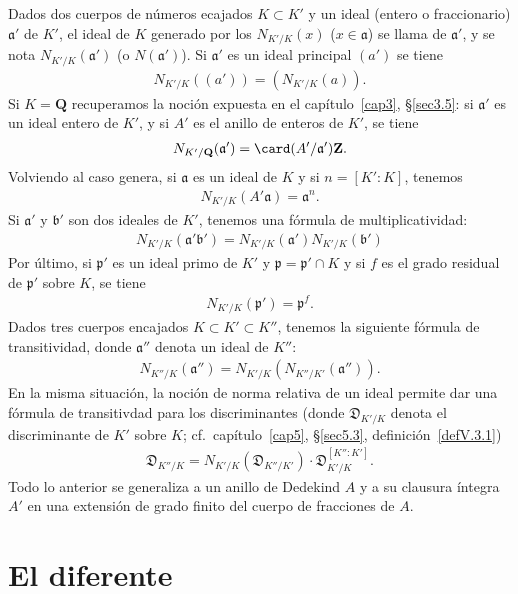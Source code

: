 \documentclass[bibtotoc,leqno,spanish]{amsbook}
\let\emph\relax %
\newcommand{\QQ}{\mathbf{Q}}
\newcommand{\ZZ}{\mathbf{Z}}
\newcommand{\idl}[1]{\mathfrak{#1}}
\newcommand{\disc}{\mathfrak{D}}
\numberwithin{equation}{section}
\theoremstyle{note}
\theoremstyle{note}
\theoremstyle{rem}
\numberwithin{theorem}{section}
\numberwithin{proposition}{section}
\numberwithin{definition}{section}
\numberwithin{lemma}{section}
\numberwithin{corollary}{section}
\numberwithin{example}{section}
\numberwithin{footnote}{section}%
\begin{document}
Dados dos cuerpos de n\'umeros ecajados $K\subset K'$ y un ideal (entero o fraccionario) $\idl{a}'$ de $K'$,
el ideal de $K$ generado por los $N_{K'/K}(x)$ ($x\in\idl{a}$) se llama \emph{norma relativa} de $\idl{a}'$,
y se nota $N_{K'/K}(\idl{a}')$ (o $N(\idl{a}')$). Si $\idl{a}'$ es un ideal principal $(a')$ se tiene
\begin{gather}
N_{K'/K}((a')) = (N_{K'/K}(a)).
\end{gather}
Si $K=\QQ$ recuperamos la noci\'on expuesta en el cap\'itulo~\ref{cap3}, \S\ref{sec3.5}: si $\idl{a}'$ es un
ideal entero de $K'$, y si $A'$ es el anillo de enteros de $K'$, se tiene
\begin{gather}
N_{K'/\QQ}(\idl{a}') = \card(A'/\idl{a}')\ZZ.
\end{gather}
Volviendo al caso genera, si $\idl{a}$ es un ideal de $K$ y si $n=[K':K]$, tenemos
\begin{gather}
N_{K'/K}(A'\idl{a}) = \idl{a}^{n}.
\end{gather}
Si $\idl{a}'$ y $\idl{b}'$ son dos ideales de $K'$, tenemos una f\'ormula de multiplicatividad:
\begin{gather}
N_{K'/K}(\idl{a}'\idl{b}') = N_{K'/K}(\idl{a}')N_{K'/K}(\idl{b}')
\end{gather}
Por \'ultimo, si $\idl{p}'$ es un ideal primo de $K'$ y $\idl{p} = \idl{p}'\cap K$ y si $f$ es el grado
residual de $\idl{p}'$ sobre $K$, se tiene
\begin{gather}
N_{K'/K}(\idl{p}') = \idl{p}^{f}.
\end{gather}
Dados tres cuerpos encajados $K\subset K'\subset K''$, tenemos la siguiente f\'ormula de transitividad, donde
$\idl{a}''$ denota un ideal de $K''$:
\begin{gather}
N_{K''/K}(\idl{a}'') = N_{K'/K}(N_{K''/K'}(\idl{a}'')).
\end{gather}
En la misma situaci\'on, la noci\'on de norma relativa de un ideal permite dar una f\'ormula de transitivdad
para los discriminantes (donde $\disc_{K'/K}$ denota el discriminante de $K'$ sobre $K$;
cf.~cap\'itulo~\ref{cap5}, \S\ref{sec5.3}, definici\'on~\ref{defV.3.1})
\begin{gather}
\disc_{K''/K}=N_{K'/K}(\disc_{K''/K'})\cdot\disc_{K'/K}^{[K'':K']}.
\end{gather}
Todo lo anterior se generaliza a un anillo de Dedekind $A$ y a su clausura \'integra $A'$ en una extensi\'on
de grado finito del cuerpo de fracciones de $A$.

\section*{El diferente}
\end{document}
